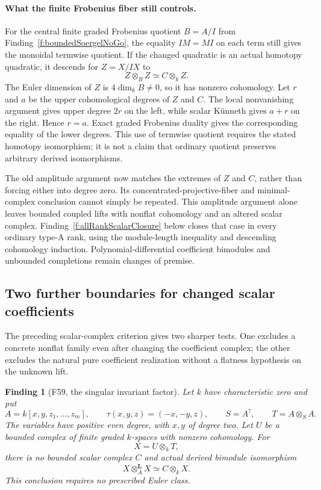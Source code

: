 \documentclass[11pt,a4paper]{article}
\newcommand{\fid}[1]{\textsf{#1}}\newcommand{\gate}[1]{\textsf{#1}}
\theoremstyle{named}\newtheorem{finding}{Finding}[section]
\theoremstyle{definition}\newtheorem{definition}[finding]{Definition}
\theoremstyle{remark}\newtheorem{remark}[finding]{Remark}
\begin{document}
\paragraph{What the finite Frobenius fiber still controls.}
For the central finite graded Frobenius quotient \(B=A/I\)
from Finding~\ref{f:boundedSoergelNoGo}, the equality
\(IM=MI\) on each term still gives the monoidal termwise
quotient. If the changed quadratic is an actual homotopy
quadratic, it descends for \(Z=X/IX\) to
\[
                     Z\otimes_B Z\simeq C\otimes_k Z.
\]
The Euler dimension of \(Z\) is \(4\dim_kB\ne0\),
so it has nonzero cohomology. Let \(r\) and \(a\)
be the upper cohomological degrees of \(Z\) and \(C\).
The local nonvanishing argument gives upper degree
\(2r\) on the left, while scalar K\"unneth gives
\(a+r\) on the right. Hence \(r=a\).
Exact graded Frobenius duality gives the corresponding
equality of the lower degrees. This use of termwise
quotient requires the stated homotopy isomorphism;
it is not a claim that ordinary quotient preserves
arbitrary derived isomorphisms.

The old amplitude argument now matches the extremes
of \(Z\) and \(C\), rather than forcing either into
degree zero. Its concentrated-projective-fiber and
minimal-complex conclusion cannot simply be repeated.
This amplitude argument alone leaves bounded coupled lifts
with nonflat cohomology and an altered scalar complex.
Finding~\ref{f:allRankScalarClosure} below closes that case
in every ordinary type-A rank, using the module-length
inequality and descending cohomology induction.
Polynomial-differential coefficient bimodules and
unbounded completions remain changes of premise.

\subsection{Two further boundaries for changed scalar coefficients}

The preceding scalar-complex criterion gives two sharper
tests. One excludes a concrete nonflat family even after
changing the coefficient complex; the other excludes the
natural pure coefficient realization without a flatness
hypothesis on the unknown lift.

\begin{finding}[\fid{F59}, the singular invariant factor]
\label{f:scalarInvariantFactorNoGo}
Let \(k\) have characteristic zero and put
\[
 A=k[x,y,z_1,\ldots,z_m],\qquad
 \tau(x,y,z)=(-x,-y,z),\qquad
 S=A^\tau,\qquad T=A\otimes_S A.
\]
The variables have positive even degree, with \(x,y\)
of degree two. Let \(U\) be a bounded complex of finite
graded \(k\)-spaces with nonzero cohomology. For
\[
                         X=U\otimes_kT,
\]
there is no bounded scalar complex \(C\) and actual
derived bimodule isomorphism
\begin{equation}\label{eq:scalarInvariantChangedQuadratic}
                 X\otimes_A^{\mathbf L}X\simeq C\otimes_kX.
\end{equation}
This conclusion requires no prescribed Euler class.
\end{finding}
\end{document}
